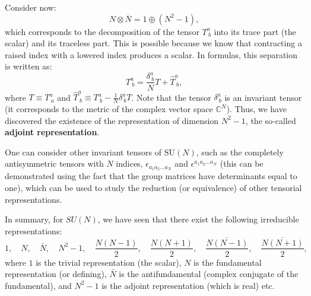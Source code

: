 Consider now:
\[
    N \otimes \overline{N} = 1 \oplus (N^2 - 1),
\]
which corresponds to the decomposition of the tensor \(T^a_{\ b}\) into its trace part (the scalar) and its traceless part. This is possible because we know that contracting a raised index with a lowered index produces a scalar. In formulas, this separation is written as:
\[
    T^a_{\ b} = \frac{\delta^a_{\ b}}{N} T + \hat{T}^a_{\ b},
\]
where \(T \equiv T^a_{\ a}\) and \(\hat{T}^a_{\ b} \equiv T^a_{\ b} - \frac{1}{N} \delta^a_{\ b} T\). Note that the tensor \(\delta^a_{\ b}\) is an invariant tensor (it corresponds to the metric of the complex vector space \(\mathbb{C}^N\)). Thus, we have discovered the existence of the representation of dimension \(N^2 - 1\), the so-called \textbf{adjoint representation}.

One can consider other invariant tensors of \(\mathrm{SU}(N)\), such as the completely antisymmetric tensors with \(N\) indices, \(\epsilon_{a_1 a_2 \ldots a_N}\) and \(\epsilon^{a_1 a_2 \ldots a_N}\) (this can be demonstrated using the fact that the group matrices have determinants equal to one), which can be used to study the reduction (or equivalence) of other tensorial representations.

In summary, for \(SU(N)\), we have seen that there exist the following irreducible representations:
\[
    1, \quad N, \quad \bar{N}, \quad N^2 - 1, \quad \frac{N(N-1)}{2}, \quad \frac{N(N+1)}{2}, \quad \frac{\overline{N(N-1)}}{2}, \quad \frac{\overline{N(N+1)}}{2},
\]
where \(1\) is the trivial representation (the scalar), \(N\) is the fundamental representation (or defining), \(\bar{N}\) is the antifundamental (complex conjugate of the fundamental), and \(N^2 - 1\) is the adjoint representation (which is real) etc.

